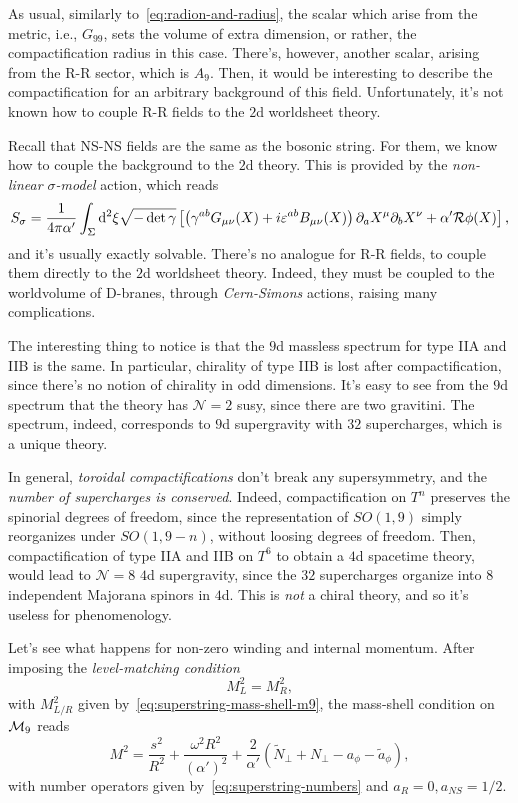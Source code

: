 As usual, similarly to~\eqref{eq:radion-and-radius}, the scalar which arise from the metric, i.e., $G_{99}$, sets the volume of extra dimension, or rather, the compactification radius in this case. There's, however, another scalar, arising from the R-R sector, which is $A_9$. Then, it would be interesting to describe the compactification for an arbitrary background of this field. Unfortunately, it's not known how to couple R-R fields to the $2$d worldsheet theory.

Recall that NS-NS fields are the same as the bosonic string. For them, we know how to couple the background to the $2$d theory. This is provided by the \emph{non-linear $\sigma$-model} action, which reads
\begin{equation*}
    S_\sigma = \frac{1}{4\pi\alpha'} \int_\Sigma \mathop{}\!\mathrm{d}^2 \xi \sqrt{-\det \gamma} \left[ \left( \gamma^{ab} G_{\mu\nu}(X) + i \varepsilon^{ab} B_{\mu\nu}(X)  \right) \partial_a X^\mu \partial_b X^\nu + \alpha' \mathcal{R} \phi(X) \right],
\end{equation*}
and it's usually exactly solvable. There's no analogue for R-R fields, to couple them directly to the $2$d worldsheet theory. Indeed, they must be coupled to the worldvolume of D-branes, through \emph{Cern-Simons} actions, raising many complications.

The interesting thing to notice is that the $9$d massless spectrum for type IIA and IIB is the same. In particular, chirality of type IIB is lost after compactification, since there's no notion of chirality in odd dimensions. It's easy to see from the $9$d spectrum that the theory has $\mathcal{N} = 2$ susy, since there are two gravitini. The spectrum, indeed, corresponds to $9$d supergravity with $32$ supercharges, which is a unique theory.

In general, \emph{toroidal compactifications} don't break any supersymmetry, and the \emph{number of supercharges is conserved}. Indeed, compactification on $T^n$ preserves the spinorial degrees of freedom, since the representation of $SO(1,9)$ simply reorganizes under $SO(1,9-n)$, without loosing degrees of freedom. Then, compactification of type IIA and IIB on $T^6$ to obtain a $4$d spacetime theory, would lead to $\mathcal{N}=8$ $4$d supergravity, since the $32$ supercharges organize into $8$ independent Majorana spinors in $4$d. This is \emph{not} a chiral theory, and so it's useless for phenomenology.

Let's see what happens for non-zero winding and internal momentum. After imposing the \emph{level-matching condition}
\begin{equation}
    M^2_L = M^2_R,
\end{equation}
with $M^2_{L/R}$ given by~\eqref{eq:superstring-mass-shell-m9}, the mass-shell condition on $\mathcal{M}_{9}$ reads
\begin{equation}\label{eq:superstring-total-mass-shell-m9}
    M^2 = \frac{s^2}{R^2} + \frac{\omega^2 R^2}{(\alpha')^2} + \frac{2}{\alpha'} (\tilde{N}_\perp + N_\perp - a_\phi - \tilde{a}_\phi),
\end{equation}
with number operators given by~\eqref{eq:superstring-numbers} and $a_{R} = 0, a_{NS} = 1/2$.

